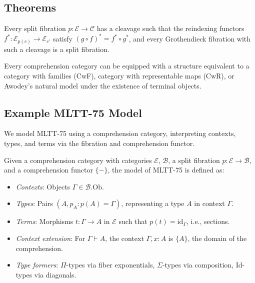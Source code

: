 \documentclass{article}
\begin{document}
\subsection{Theorems}

\begin{theorem}
Every split fibration \(p : \mathcal{E} \to \mathcal{C}\) has a cleavage such that the reindexing functors \(f^* : \mathcal{E}_{p(e)} \to \mathcal{E}_{c'}\) satisfy \((g \circ f)^* = f^* \circ g^*\), and every Grothendieck fibration with such a cleavage is a split fibration.
\end{theorem}

\begin{theorem}
Every comprehension category can be equipped with a
structure equivalent to a category with families (CwF), category with representable maps (CwR),
or Awodey's natural model under the existence of terminal objects.
\end{theorem}

\newpage
\subsection{Example MLTT-75 Model}

We model MLTT-75 using a comprehension category, interpreting contexts, types, and terms via the fibration and comprehension functor.

\begin{definition}
Given a comprehension category with categories $\mathcal{E}$, $\mathcal{B}$, a split fibration $p : \mathcal{E} \to \mathcal{B}$, and a comprehension functor $\{-\}$, the model of MLTT-75 is defined as:
\begin{itemize}
  \item \emph{Contexts}: Objects $\Gamma \in \mathcal{B}.\text{Ob}$.
  \item \emph{Types}: Pairs $(A, p_A : p(A) = \Gamma)$, representing a type $A$ in context $\Gamma$.
  \item \emph{Terms}: Morphisms $t : \Gamma \to A$ in $\mathcal{E}$ such that $p(t) = \text{id}_\Gamma$, i.e., sections.
  \item \emph{Context extension}: For $\Gamma \vdash A$, the context $\Gamma, x : A$ is $\{A\}$, the domain of the comprehension.
  \item \emph{Type formers}: $\Pi$-types via fiber exponentials, $\Sigma$-types via composition, Id-types via diagonals.
\end{itemize}
\end{definition}
\end{document}

